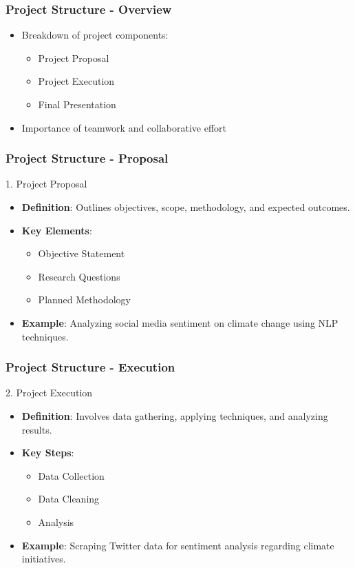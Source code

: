 \documentclass[aspectratio=169]{beamer}
\begin{document}
\begin{frame}[fragile]
    \frametitle{Project Structure - Overview}
    \begin{itemize}
        \item Breakdown of project components:
        \begin{itemize}
            \item Project Proposal
            \item Project Execution
            \item Final Presentation
        \end{itemize}
        \item Importance of teamwork and collaborative effort
    \end{itemize}
\end{frame}

\begin{frame}[fragile]
    \frametitle{Project Structure - Proposal}
    \begin{block}{1. Project Proposal}
        \begin{itemize}
            \item \textbf{Definition}: Outlines objectives, scope, methodology, and expected outcomes.
            \item \textbf{Key Elements}:
            \begin{itemize}
                \item Objective Statement
                \item Research Questions
                \item Planned Methodology
            \end{itemize}
            \item \textbf{Example}: Analyzing social media sentiment on climate change using NLP techniques.
        \end{itemize}
    \end{block}
\end{frame}

\begin{frame}[fragile]
    \frametitle{Project Structure - Execution}
    \begin{block}{2. Project Execution}
        \begin{itemize}
            \item \textbf{Definition}: Involves data gathering, applying techniques, and analyzing results.
            \item \textbf{Key Steps}:
            \begin{itemize}
                \item Data Collection
                \item Data Cleaning
                \item Analysis
            \end{itemize}
            \item \textbf{Example}: Scraping Twitter data for sentiment analysis regarding climate initiatives.
        \end{itemize}
    \end{block}
\end{frame}
\end{document}
